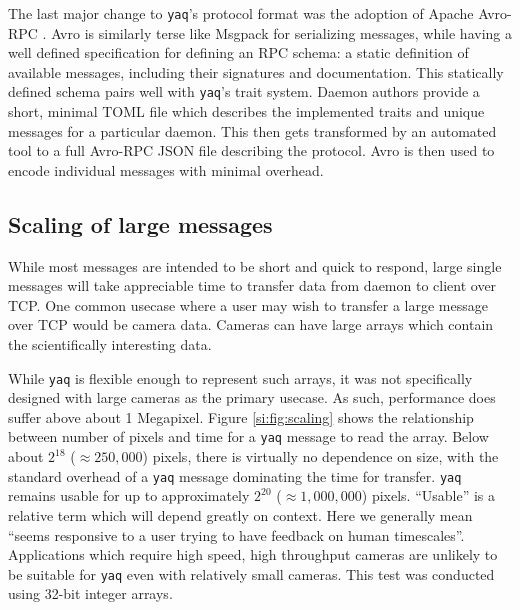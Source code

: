 \documentclass[11pt, full]{article}
\newcommand\yaq{\texttt{yaq}}
\begin{document}
The last major change to \yaq{}'s protocol format was the adoption of Apache Avro-RPC \cite{AvroSpecification}.
Avro is similarly terse like Msgpack for serializing messages, while having a well defined specification for defining an RPC schema: a static definition of available messages, including their signatures and documentation.
This statically defined schema pairs well with \yaq{}'s trait system.
Daemon authors provide a short, minimal TOML file which describes the implemented traits and unique messages for a particular daemon.
This then gets transformed by an automated tool to a full Avro-RPC JSON file describing the protocol.
Avro is then used to encode individual messages with minimal overhead.


\subsection{Scaling of large messages}

While most messages are intended to be short and quick to respond, large single messages will take appreciable time to transfer data from daemon to client over TCP.
One common usecase where a user may wish to transfer a large message over TCP would be camera data.
Cameras can have large arrays which contain the scientifically interesting data.

While \yaq{} is flexible enough to represent such arrays, it was not specifically designed with large cameras as the primary usecase.
As such, performance does suffer above about 1 Megapixel.
Figure \ref{si:fig:scaling} shows the relationship between number of pixels and time for a \yaq{} message to read the array.
Below about $2^{18}$ ($\approx250,000$) pixels, there is virtually no dependence on size, with the standard overhead of a \yaq{} message dominating the time for transfer.
\yaq{} remains usable for up to approximately $2^{20}$ ($\approx1,000,000$) pixels.
``Usable'' is a relative term which will depend greatly on context.
Here we generally mean ``seems responsive to a user trying to have feedback on human timescales''.
Applications which require high speed, high throughput cameras are unlikely to be suitable for \yaq{} even with relatively small cameras.
This test was conducted using 32-bit integer arrays.
\end{document}
